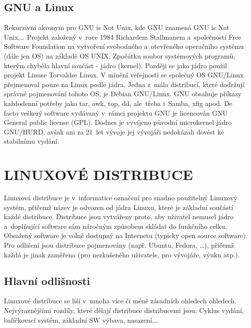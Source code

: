 \documentclass[a4paper,12pt]{article}
\newcommand{\upc}[1]{\uppercase{#1}} %
\begin{document}
\subsection{GNU a Linux} 
Rekurzivní akronym pro GNU is Not Unix, kde GNU znamená GNU is Not Unix,…
Projekt založený v~roce 1984 Richardem Stallmanem a~společností Free Software Foundation na vytvoření svobodného a~otevřeného operačního systému (dále jen OS) na základě OS UNIX. Zpočátku soubor systémových programů, kterým chyběla hlavní součást - jádro (kernel). Později se jako jádro použil projekt Linuse Torvaldse Linux. V mínění veřejnosti se společný OS GNU/Linux přejmenoval pouze na Linux podle jádra. Jedna z~mála distribucí, které dodržují správné pojmenování tohoto OS, je Debian GNU/Linux.
GNU obsahuje příkazy každodenní potřeby jako tar, awk, top, dd, ale~třeba i~Samba, xfig apod. De facto veškerý software vydávaný v~rámci projektu GNU je licencován GNU General public license (GPL). Dodnes je vyvíjeno původní microkernel jádro GNU/HURD, avšak ani za 21~let vývoje jej vývojáři nedokázali dovést ke stabilnímu vydání.~\cite{GNUABCLinuxu}~\cite{GNUweb}~\cite{ROOT_HURD}


\section{\upc{Linuxové distribuce}}
Linuxová distribuce je v~informatice označení pro snadno použitelný Linuxový systém, přičemž název je odvozen od jádra Linuxu, které je základní součástí každé distribuce. Distribuce jsou vytvářeny proto, aby uživatel nemusel jádro a~doplňující software sám náročným způsobem skládat do funkčního celku. Obsažený software je volně dostupný na Internetu (typicky open source software). Pro odlišení jsou distribuce pojmenovány (např. Ubuntu, Fedora, …), přičemž každá je jinak zaměřena (pro nezkušeného uživatele, pro vývojáře, výuku atp.).\cite{WDIST}

\subsection{Hlavní odlišnosti}
Linuxové distribuce se liší v~mnoha více či méně zásadních ohledech ohledech. Nejvýraznějšími rozdíly, které dělají distribuce distribucemi jsou: Cyklus vydání, balíčkovací systém, základní SW výbava, nasazení,…
\end{document}
